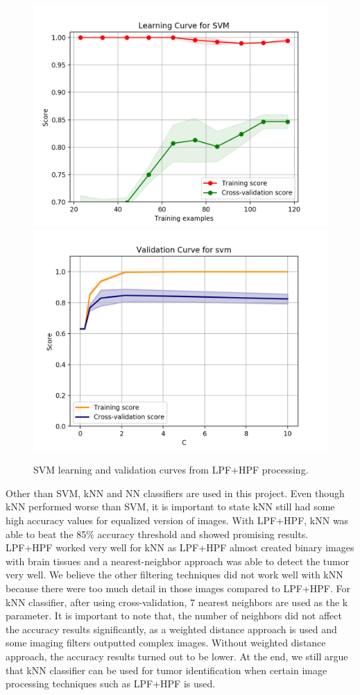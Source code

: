 \documentclass[conference]{IEEEtran}
\begin{document}
\begin{figure}[h]
\centering
\includegraphics[scale=0.26]{learning_curve}
\includegraphics[scale=0.26]{validation_curve}
\caption{SVM learning and validation curves from LPF+HPF processing.}
\end{figure}

Other than SVM, kNN and NN classifiers are used in this project. Even though kNN performed worse than SVM, it is important to state kNN still had some high accuracy values for equalized version of images. With LPF+HPF, kNN was able to beat the 85\% accuracy threshold and showed promising results. LPF+HPF worked very well for kNN as LPF+HPF almost created binary images with brain tissues and a nearest-neighbor approach was able to detect the tumor very well. We believe the other filtering techniques did not work well with kNN because there were too much detail in those images compared to LPF+HPF. For kNN classifier, after using cross-validation, 7 nearest neighbors are used as the k parameter. It is important to note that, the number of neighbors did not affect the accuracy results significantly, as a weighted distance approach is used and some imaging filters outputted complex images. Without weighted distance approach, the accuracy results turned out to be lower. At the end, we still argue that kNN classifier can be used for tumor identification when certain image processing techniques such as LPF+HPF is used. 
\end{document}
